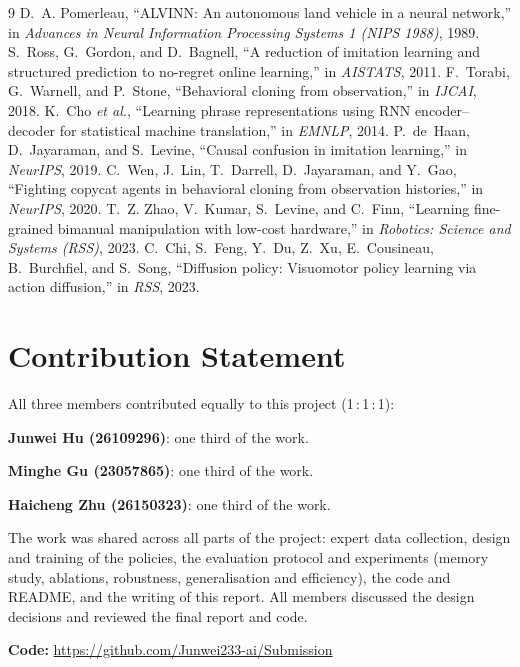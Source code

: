 \documentclass[conference]{IEEEtran}
\begin{document}
\begin{thebibliography}{9}
 D.~A. Pomerleau, ``ALVINN: An autonomous land vehicle in a neural network,'' in
\emph{Advances in Neural Information Processing Systems 1 (NIPS 1988)}, 1989.
 S.~Ross, G.~Gordon, and D.~Bagnell, ``A reduction of imitation learning and structured
prediction to no-regret online learning,'' in \emph{AISTATS}, 2011.
 F.~Torabi, G.~Warnell, and P.~Stone, ``Behavioral cloning from observation,'' in
\emph{IJCAI}, 2018.
 K.~Cho \emph{et al.}, ``Learning phrase representations using RNN encoder--decoder for
statistical machine translation,'' in \emph{EMNLP}, 2014.
 P.~de~Haan, D.~Jayaraman, and S.~Levine, ``Causal confusion in imitation
learning,'' in \emph{NeurIPS}, 2019.
 C.~Wen, J.~Lin, T.~Darrell, D.~Jayaraman, and Y.~Gao, ``Fighting copycat agents
in behavioral cloning from observation histories,'' in \emph{NeurIPS}, 2020.
 T.~Z. Zhao, V.~Kumar, S.~Levine, and C.~Finn, ``Learning fine-grained bimanual
manipulation with low-cost hardware,'' in \emph{Robotics: Science and Systems (RSS)}, 2023.
 C.~Chi, S.~Feng, Y.~Du, Z.~Xu, E.~Cousineau, B.~Burchfiel, and S.~Song,
``Diffusion policy: Visuomotor policy learning via action diffusion,'' in \emph{RSS}, 2023.
\end{thebibliography}

\clearpage
\section*{Contribution Statement}
\noindent All three members contributed equally to this project (1\,:\,1\,:\,1):

\noindent\textbf{Junwei Hu (26109296)}: one third of the work.

\noindent\textbf{Minghe Gu (23057865)}: one third of the work.

\noindent\textbf{Haicheng Zhu (26150323)}: one third of the work.

\noindent The work was shared across all parts of the project: expert data collection, design and
training of the policies, the evaluation protocol and experiments (memory study, ablations, robustness,
generalisation and efficiency), the code and README, and the writing of this report. All members
discussed the design decisions and reviewed the final report and code.

\noindent\textbf{Code:} \url{https://github.com/Junwei233-ai/Submission}
\end{document}
